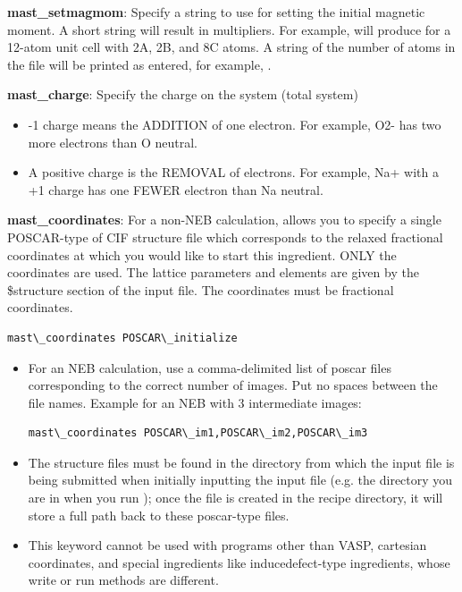 \documentclass[letterpaper,10pt,english]{sphinxmanual}
\begin{document}
\textbf{mast\_setmagmom}: Specify a string to use for setting the initial magnetic moment. A short string will result in multipliers. For example,  will produce  for a 12-atom unit cell with 2A, 2B, and 8C atoms. A string of the number of atoms in the  file will be printed as entered, for example, .

\textbf{mast\_charge}: Specify the charge on the system (total system)
\begin{itemize}
\item {} 
-1 charge means the ADDITION of one electron. For example, O2- has two more electrons than O neutral.

\item {} 
A positive charge is the REMOVAL of electrons. For example, Na+ with a +1 charge has one FEWER electron than Na neutral.

\end{itemize}

\textbf{mast\_coordinates}: For a non-NEB calculation, allows you to specify a single POSCAR-type of CIF structure file which corresponds to the relaxed fractional coordinates at which you would like to start this ingredient. ONLY the coordinates are used. The lattice parameters and elements are given by the \$structure section of the input file. The coordinates must be fractional coordinates.

\begin{Verbatim}[commandchars=\\\{\}]
mast\_coordinates POSCAR\_initialize
\end{Verbatim}
\begin{itemize}
\item {} 
For an NEB calculation, use a comma-delimited list of poscar files corresponding to the correct number of images. Put no spaces between the file names. Example for an NEB with 3 intermediate images:

\begin{Verbatim}[commandchars=\\\{\}]
mast\_coordinates POSCAR\_im1,POSCAR\_im2,POSCAR\_im3
\end{Verbatim}

\item {} 
The structure files must be found in the directory from which the input file is being submitted when initially inputting the input file (e.g. the directory you are in when you run ); once the  file is created in the recipe directory, it will store a full path back to these poscar-type files.

\item {} 
This keyword cannot be used with programs other than VASP, cartesian coordinates, and special ingredients like inducedefect-type ingredients, whose write or run methods are different.

\end{itemize}
\end{document}
